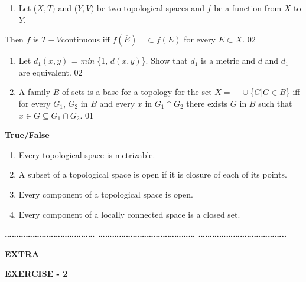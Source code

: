 \documentclass[12pt]{amsart}
\begin{document}
\begin{enumerate}
\item Let ($X, T )$ and ($Y, V)$ be two topological spaces and $f$ be a function from $X$ to $Y$. 
\end{enumerate}
Then $f$ is $T-V $continuous iff $f (\overline E ) \quad \subset \overline {f(E)} $ for 
every $E \subset X$. 02

\begin{enumerate}
\item Let $d_{1}(x, y)$ \textit{= min }{\{}1, $d(x, y)${\}}. Show that $d_{1}$ is a metric and $d$ and $d_{1}$ are equivalent. 02
\item A family $B$ of sets is a base for a topology for the set $X = \quad \cup ${\{}$G\vert G\in B${\}} iff for every $G_{1}$, $G_{2}$ in $B$ and every $x$ in $G_{1}\cap G_{2}$ there exists $G$ in $B$ such that $x\in G\subseteq G_{1}\cap G_{2}$. 01
\end{enumerate}

\textbf{True/False}

\begin{enumerate}
\item Every topological space is metrizable.
\item A subset of a topological space is open if it is closure of each of its points.
\item Every component of a topological space is open.
\item Every component of a locally connected space is a closed set.
\end{enumerate}

\textbf{{\ldots}{\ldots}{\ldots}{\ldots}{\ldots}{\ldots}{\ldots}{\ldots}{\ldots}{\ldots}{\ldots}{\ldots}{\ldots} 
{\ldots}{\ldots}{\ldots}{\ldots}{\ldots}{\ldots}{\ldots}{\ldots}{\ldots}{\ldots}{\ldots}{\ldots}{\ldots}{\ldots} 
{\ldots}{\ldots}{\ldots}{\ldots}{\ldots}{\ldots}{\ldots}{\ldots}{\ldots}{\ldots}{\ldots}{\ldots}..}

\textbf{EXTRA}

\textbf{EXERCISE - 2}
\end{document}
